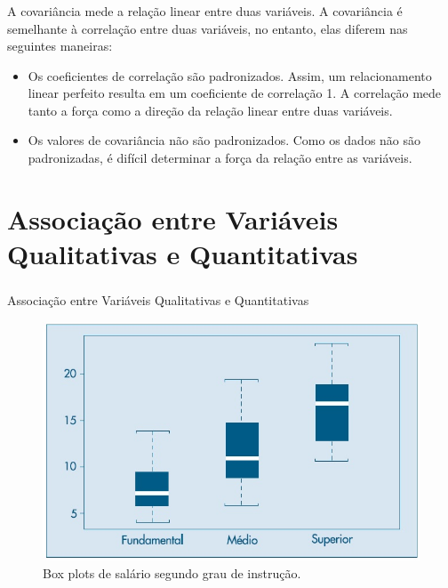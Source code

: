 \documentclass[14pt,aspectratio=1610]{beamer}
\begin{document}
\begin{frame}{}
\frametitle{}
A covariância mede a relação linear entre duas variáveis. A covariância é semelhante à correlação entre duas variáveis, no entanto, elas diferem nas seguintes maneiras:
\begin{itemize}
\item Os coeficientes de correlação são padronizados. Assim, um relacionamento linear perfeito resulta em um coeficiente de correlação 1. A correlação mede tanto a força como a direção da relação linear entre duas variáveis.\pause
\item Os valores de covariância não são padronizados. Como os dados não são padronizadas, é difícil determinar a força da relação entre as variáveis.
\end{itemize}
\end{frame}

\section{Associação entre Variáveis Qualitativas e Quantitativas}
\begin{frame}{}
\frametitle{}
Associação entre Variáveis Qualitativas e Quantitativas
\begin{figure}[H]
    \centering
    \includegraphics[scale=0.5]{Figuras/boxplot}
    \caption{Box plots de salário segundo grau de instrução. \cite{Morettin09}}
  \end{figure}
\end{frame}
\end{document}
